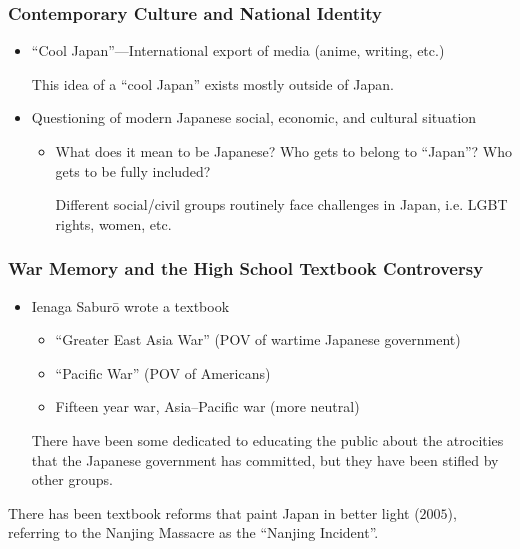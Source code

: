\documentclass[class=article, crop=false]{standalone}
\begin{document}
  \subsubsection{Contemporary Culture and National Identity}
  \begin{itemize}
    \item ``Cool Japan''---International export of media (anime, writing, etc.)
    \begin{note}{}
      This idea of a ``cool Japan'' exists mostly outside of Japan.
    \end{note}
    \item Questioning of modern Japanese social, economic, and cultural situation
    \begin{itemize}
      \item What does it mean to be Japanese? Who gets to belong to ``Japan''? Who gets to be fully included?
      \begin{note}{}
        Different social/civil groups routinely face challenges in Japan, i.e. LGBT rights, women, etc.
      \end{note}
    \end{itemize}
  \end{itemize}
  \subsubsection{War Memory and the High School Textbook Controversy}
  \begin{itemize}
    \item Ienaga Sabur\=o wrote a textbook
    \begin{itemize}
      \item ``Greater East Asia War'' (POV of wartime Japanese government)
      \item ``Pacific War'' (POV of Americans)
      \item Fifteen year war, Asia--Pacific war (more neutral)
    \end{itemize}
    \begin{note}{}
      There have been some dedicated to educating the public about the atrocities that the Japanese government has committed, but they have been stifled by other groups.
    \end{note}
  \end{itemize}
  \begin{note}{}
    There has been textbook reforms that paint Japan in better light ($2005$), referring to the Nanjing Massacre as the ``Nanjing Incident''.
  \end{note}
\end{document}
